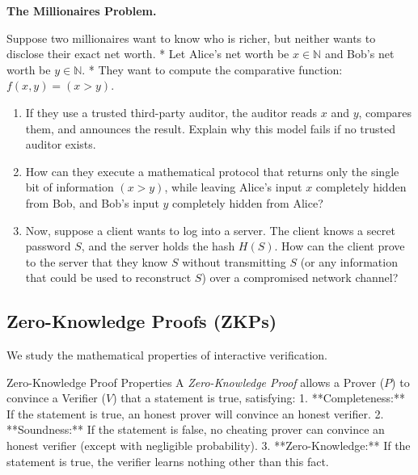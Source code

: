 \documentclass[12pt, a4paper]{book}
\newcommand{\newterm}[1]{\textit{\textcolor{DiscoveryColor}{#1}}}
\begin{document}
\begin{puzzlebox}
\textbf{The Millionaires Problem.}

Suppose two millionaires want to know who is richer, but neither wants to disclose their exact net worth.
* Let Alice's net worth be $x \in \mathbb{N}$ and Bob's net worth be $y \in \mathbb{N}$.
* They want to compute the comparative function: $f(x, y) = (x > y)$.
\begin{enumerate}[label=(\alph*), leftmargin=*]
  \item If they use a trusted third-party auditor, the auditor reads $x$ and $y$, compares them, and announces the result.
        Explain why this model fails if no trusted auditor exists.
  \item How can they execute a mathematical protocol that returns only the single bit of information $(x > y)$, while leaving Alice's input $x$ completely hidden from Bob, and Bob's input $y$ completely hidden from Alice?
  \item Now, suppose a client wants to log into a server.
        The client knows a secret password $S$, and the server holds the hash $H(S)$.
        How can the client prove to the server that they know $S$ without transmitting $S$ (or any information that could be used to reconstruct $S$) over a compromised network channel?
\end{enumerate}
\end{puzzlebox}

\subsection{Zero-Knowledge Proofs (ZKPs)}

We study the mathematical properties of interactive verification.

\begin{namedconcept}{Zero-Knowledge Proof Properties}
A \newterm{Zero-Knowledge Proof} allows a Prover ($P$) to convince a Verifier ($V$) that a statement is true, satisfying:
1. **Completeness:** If the statement is true, an honest prover will convince an honest verifier.
2. **Soundness:** If the statement is false, no cheating prover can convince an honest verifier (except with negligible probability).
3. **Zero-Knowledge:** If the statement is true, the verifier learns nothing other than this fact.
\end{namedconcept}
\end{document}
